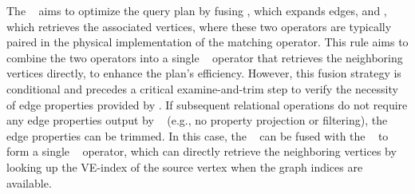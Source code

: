 The \joinfuserule~ aims to optimize the query plan by fusing \expandedge, which expands edges, and \getvertex, which retrieves the associated vertices, where these two operators are typically paired in the physical implementation of the matching operator. This rule aims to combine the two operators into a single \expand~ operator that retrieves the neighboring vertices directly, to enhance the plan's efficiency.
However, this fusion strategy is conditional and precedes a critical examine-and-trim step to verify the necessity of edge properties provided by \expandedge.
If subsequent relational operations do not require any edge properties output by \getvertex~ (e.g., no property projection or filtering), the edge properties can be trimmed.
In this case, the \expandedge~ can be fused with the \getvertex~ to form a single \expand~ operator, which can directly retrieve the neighboring vertices by looking up the VE-index of the source vertex when the graph indices are available.
%

